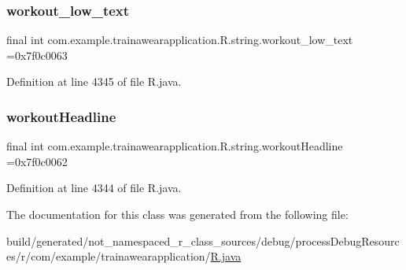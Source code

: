 \subsubsection{\texorpdfstring{workout\_low\_text}{workout\_low\_text}}
{\footnotesize\ttfamily final int com.\+example.\+trainawearapplication.\+R.\+string.\+workout\+\_\+low\+\_\+text =0x7f0c0063\hspace{0.3cm}{\ttfamily [static]}}



Definition at line 4345 of file R.\+java.

\mbox{\label{classcom_1_1example_1_1trainawearapplication_1_1_r_1_1string_abf8bce5fc2a7b055f6d5404aa451d626}} 
\subsubsection{\texorpdfstring{workoutHeadline}{workoutHeadline}}
{\footnotesize\ttfamily final int com.\+example.\+trainawearapplication.\+R.\+string.\+workout\+Headline =0x7f0c0062\hspace{0.3cm}{\ttfamily [static]}}



Definition at line 4344 of file R.\+java.



The documentation for this class was generated from the following file\+:\begin{DoxyCompactItemize}
\item 
build/generated/not\+\_\+namespaced\+\_\+r\+\_\+class\+\_\+sources/debug/process\+Debug\+Resources/r/com/example/trainawearapplication/\mbox{\hyperlink{com_2example_2trainawearapplication_2_r_8java}{R.\+java}}\end{DoxyCompactItemize}

